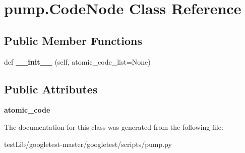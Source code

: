 \hypertarget{classpump_1_1CodeNode}{}\section{pump.\+Code\+Node Class Reference}
\label{classpump_1_1CodeNode}
\subsection*{Public Member Functions}
\begin{DoxyCompactItemize}
\item 
\mbox{\label{classpump_1_1CodeNode_a2ca8a75324a64e48004812d6c0bc1cbd}} 
def {\bfseries \+\_\+\+\_\+init\+\_\+\+\_\+} (self, atomic\+\_\+code\+\_\+list=None)
\end{DoxyCompactItemize}
\subsection*{Public Attributes}
\begin{DoxyCompactItemize}
\item 
\mbox{\label{classpump_1_1CodeNode_ac7251110cc987c709e0e17d95521993e}} 
{\bfseries atomic\+\_\+code}
\end{DoxyCompactItemize}


The documentation for this class was generated from the following file\+:\begin{DoxyCompactItemize}
\item 
test\+Lib/googletest-\/master/googletest/scripts/pump.\+py\end{DoxyCompactItemize}
